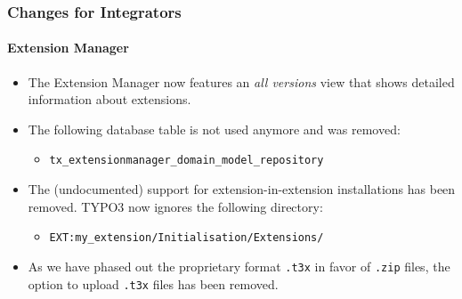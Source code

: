%

\begin{frame}[fragile]
	\frametitle{Changes for Integrators}
	\framesubtitle{Extension Manager}

	\begin{itemize}

		\item The Extension Manager now features an \textit{all versions} view
			that shows detailed information about extensions.

		\item The following database table is not used anymore and was removed:
			\begin{itemize}\small
				\item \texttt{tx\_extensionmanager\_domain\_model\_repository}
			\end{itemize}\normalsize
			\vspace{0.2cm}

		\item The (undocumented) support for extension-in-extension installations
			has been removed. TYPO3 now ignores the following directory:
			\begin{itemize}\small
				\item \texttt{EXT:my\_extension/Initialisation/Extensions/}
			\end{itemize}
			\vspace{0.2cm}

		\item As we have phased out the proprietary format \texttt{.t3x} in favor
			of \texttt{.zip} files, the option to upload \texttt{.t3x} files
			has been removed.

	\end{itemize}

\end{frame}

